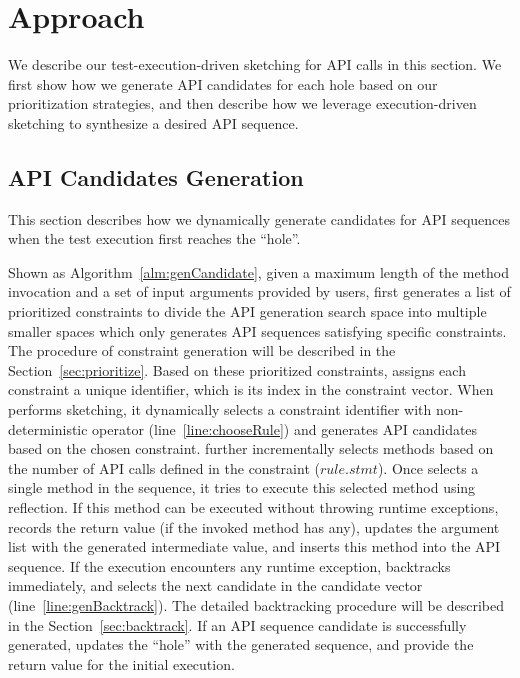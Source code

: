 \section{Approach}\label{sec:approach}


We describe our test-execution-driven sketching for API calls in this section. We first show how we generate API candidates for each hole based on our prioritization strategies, and then describe how we leverage execution-driven sketching to synthesize a desired API sequence.  


\subsection{API Candidates Generation} 

This section describes how we dynamically generate candidates for API sequences when the test execution first reaches the ``hole''. 

  Shown as Algorithm~\ref{alm:genCandidate},  given a maximum length of the method invocation and a set of input arguments provided by users, \tool first generates a list of prioritized constraints to divide the API generation search space into multiple smaller spaces which only generates API sequences satisfying specific constraints.  The procedure of constraint generation will be described in the Section~\ref{sec:prioritize}.  Based on these prioritized constraints, \tool assigns each constraint a unique identifier, which is its index in the constraint vector.  When \tool performs sketching, it dynamically selects a constraint identifier with non-deterministic  operator (line~\ref{line:chooseRule}) and generates API candidates based on the chosen constraint. \tool further incrementally selects  methods based on the number of API calls defined in the constraint ($rule.stmt$).  Once \tool selects a single method in the sequence, it tries to execute this  selected method using reflection. If this method can be executed without throwing runtime exceptions,  \tool records the return value (if the invoked method has any),  updates the argument list with the generated intermediate value, and inserts this method into the API sequence. If the execution encounters any runtime exception, \tool backtracks immediately, and selects the next candidate in the candidate vector (line~\ref{line:genBacktrack}). The detailed backtracking procedure will be described in the Section~\ref{sec:backtrack}. If an API sequence candidate is successfully generated, \tool updates the ``hole'' with the generated sequence, and provide the return value for the initial execution. 


